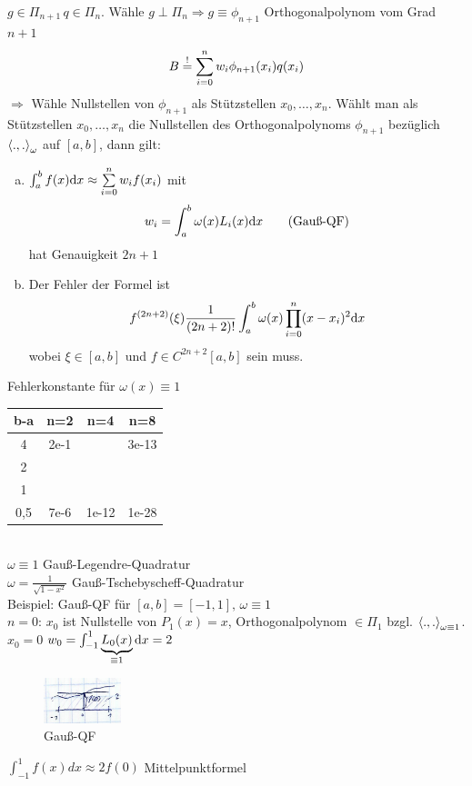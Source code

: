 $g \in \Pi_{n+1}\, q \in \Pi_n$. Wähle $g \perp \Pi_n \Rightarrow g \equiv \phi_{n+1}$ Orthogonalpolynom vom Grad $n+1$
\begin{align*}
  B \overset{!}{=} \sum\limits_{i=0}^{n}{w_i \phi_{n+1}(x_i) q(x_i)}
\end{align*}
$\Rightarrow$ Wähle Nullstellen von $\phi_{n+1}$ als Stützstellen $x_0, \ldots,x_n$.
 Wählt man als Stützstellen $x_0,\ldots,x_n$ die Nullstellen
des Orthogonalpolynoms $\phi_{n+1}$ bezüglich $\left\langle ., . \right\rangle_\omega$ auf $[a,b]$, dann gilt:
\begin{enumerate}[a)]
  \item $\int_a^b f(x) \mathrm{d}x \approx \sum\limits_{i=0}^{n}{w_i f(x_i)}$ mit
    \begin{align*} w_i = \int_a^b \omega(x) L_i(x) \mathrm{d}x \tag{Gauß-QF}\end{align*}
    hat Genauigkeit $2n + 1$
  \item Der Fehler der Formel ist \begin{align*}
      f^{(2n+2)}(\xi) \frac{1}{(2n+2)!} \int_a^b \omega(x) \prod_{i=0}^{n} (x-x_i)^2 \mathrm{d}x
    \end{align*} wobei $\xi \in [a,b]$ und $f \in C^{2n+2}[a,b]$ sein muss.
\end{enumerate}
Fehlerkonstante für $\omega(x) \equiv 1$\\
\begin{tabular}{ c | c | c | c}
  b-a & n=2 & n=4 & n=8 \\
  \hline
  4   &  2e-1 & & 3e-13\\
  2   &       & &      \\
  1   &       & &      \\
  0,5 & 7e-6  & 1e-12 & 1e-28\\
\end{tabular}\\
$\omega \equiv 1$ Gauß-Legendre-Quadratur\\
$\omega = \frac{1}{\sqrt{1-x^2}}$  Gauß-Tschebyscheff-Quadratur\\

Beispiel: Gauß-QF für $[a,b] = [-1,1],\, \omega \equiv 1$\\
$n=0$: $x_0$ ist Nullstelle von $P_1(x)=x$, Orthogonalpolynom $\in \Pi_1$ bzgl. $\left\langle ., . \right\rangle_{\omega \equiv 1}$.\\
$x_0 = 0$ $w_0 = \int_{-1}^1 \underbrace{L_0(x)}_{\equiv 1} \mathrm{d}x = 2$\\
\begin{figure}[htbp]
  \centering
  \includegraphics[width=0.2\textwidth]{figures/gauss_qf.png}
  \caption{Gauß-QF}
\end{figure}
$\int_{-1}^1 f(x) dx \approx 2 f(0)$ Mittelpunktformel\\


